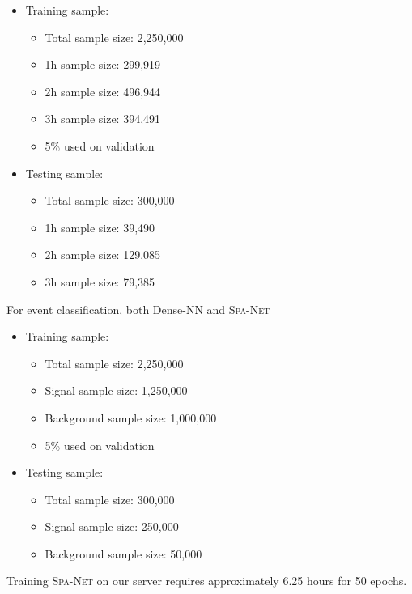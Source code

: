 \documentclass[12pt]{article}
\begin{document}
    \begin{itemize}
        \item Training sample:
        \begin{itemize}
            \item Total sample size: 2,250,000
            \item 1h sample size: 299,919
            \item 2h sample size: 496,944
            \item 3h sample size: 394,491            
            \item 5\% used on validation
        \end{itemize}
        \item Testing sample:
        \begin{itemize}
            \item Total sample size: 300,000
            \item 1h sample size: 39,490
            \item 2h sample size: 129,085
            \item 3h sample size: 79,385
        \end{itemize}
    \end{itemize}

    For event classification, both Dense-NN and \textsc{Spa-Net}
    \begin{itemize}
        \item Training sample:
        \begin{itemize}
            \item Total sample size: 2,250,000
            \item Signal sample size: 1,250,000
            \item Background sample size: 1,000,000
            \item 5\% used on validation
        \end{itemize}
        \item Testing sample:
        \begin{itemize}
            \item Total sample size: 300,000
            \item Signal sample size: 250,000
            \item Background sample size: 50,000
        \end{itemize}
    \end{itemize}

    Training \textsc{Spa-Net} on our server requires approximately 6.25 hours for 50 epochs.
\end{document}
